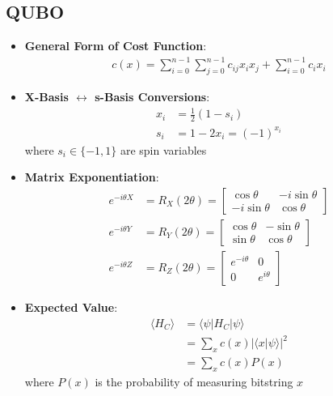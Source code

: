 \begin{multicols}{3}
    \section*{QUBO}
    \begin{itemize}[leftmargin=*,nosep,topsep=0pt]
      \item \textbf{General Form of Cost Function}:
        \begin{align*}
          c(x) = \sum_{i = 0}^{n - 1} \sum_{j = 0}^{n - 1} c_{ij} x_i x_j +
          \sum_{i = 0}^{n - 1} c_i x_i
        \end{align*}
      \item \textbf{X-Basis $\leftrightarrow$ s-Basis Conversions}:
        \begin{align*}
          x_i &= \frac{1}{2}(1 - s_i) \\
          s_i &= 1 - 2x_i = (-1)^{x_i}
        \end{align*}
        where $s_i \in \{-1,1\}$ are spin variables
      \item \textbf{Matrix Exponentiation}:
        \begin{align*}
          e^{-i\theta X} &= R_X(2\theta) = \begin{bmatrix} \cos\theta & -i\sin\theta \\ -i\sin\theta & \cos\theta \end{bmatrix} \\
          e^{-i\theta Y} &= R_Y(2\theta) = \begin{bmatrix} \cos\theta & -\sin\theta \\ \sin\theta & \cos\theta \end{bmatrix} \\
          e^{-i\theta Z} &= R_Z(2\theta) = \begin{bmatrix} e^{-i\theta} & 0 \\ 0 & e^{i\theta} \end{bmatrix}
        \end{align*}
      \item \textbf{Expected Value}:
        \begin{align*}
          \langle H_C \rangle &= \langle\psi|H_C|\psi\rangle \\
                              &= \sum_x c(x)|\langle x|\psi\rangle|^2 \\
                              &= \sum_x c(x)P(x)
        \end{align*}
        where $P(x)$ is the probability of measuring bitstring $x$
    \end{itemize}


\end{multicols}
